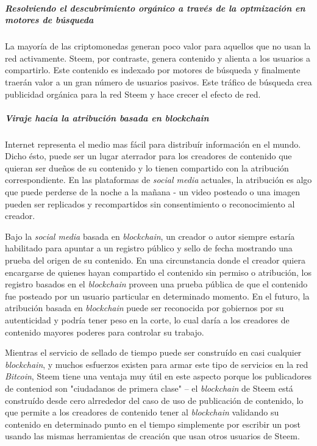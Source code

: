 \documentclass[a4paper,titlepage,final]{article}
\begin{document}
\subparagraph{Resolviendo el descubrimiento orgánico a través de la optmización en motores de búsqueda}

La mayoría de las criptomonedas generan poco valor para aquellos que no usan la red activamente. Steem, por contraste, genera contenido y alienta a los usuarios a compartirlo. Este contenido es indexado por motores de búsqueda y finalmente traerán valor a un gran número de usuarios pasivos. Este tráfico de búsqueda crea publicidad orgánica para la red Steem y hace crecer el efecto de red.

\subparagraph{Viraje hacia la atribución basada en \textit{blockchain}}

Internet representa el medio mas fácil para distribuír información en el mundo. Dicho ésto, puede ser un lugar aterrador para los creadores de contenido que quieran ser dueños de su contenido y lo tienen compartido con la atribución correspondiente. En las plataformas de \textit{social media} actuales, la atribución es algo que puede perderse de la noche a la mañana - un video posteado o una imagen pueden ser replicados y recompartidos sin consentimiento o reconocimiento al creador.

Bajo la \textit{social media} basada en \textit{blockchain}, un creador o autor siempre estaría habilitado para apuntar a un registro público y sello de fecha mostrando una prueba del origen de su contenido. En una circunstancia donde el creador quiera encargarse de quienes hayan compartido el contenido sin permiso o atribución, los registro basados en el \textit{blockchain} proveen una prueba pública de que el contenido fue posteado por un usuario particular en determinado momento. En el futuro, la atribución basada en \textit{blockchain} puede ser reconocida por gobiernos por su autenticidad y podría tener peso en la corte, lo cual daría a los creadores de contenido mayores poderes para controlar su trabajo.

Mientras el servicio de sellado de tiempo puede ser construído en casi cualquier \textit{blockchain}, y muchos esfuerzos existen para armar este tipo de servicios en la red \textit{Bitcoin}, Steem tiene una ventaja muy útil en este aspecto porque los publicadores de conteniod son "ciudadanos de primera clase" -- el \textit{blockchain} de Steem está construído desde cero alrrededor del caso de uso de publicación de contenido, lo que permite a los creadores de contenido tener al \textit{blockchain} validando su contenido en determinado punto en el tiempo simplemente por escribir un post usando las mismas herramientas de creación que usan otros usuarios de Steem.
\end{document}
